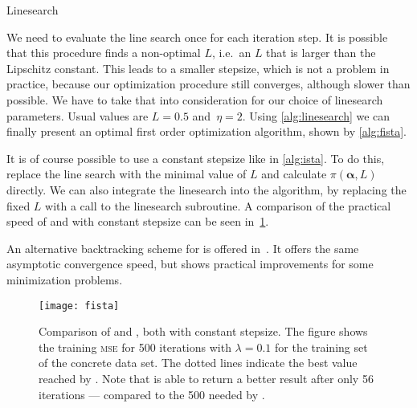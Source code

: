 \begin{algorithm}[h!]
 \caption{Linesearch~\cite{fista}}\label{alg:linesearch}
 \begin{algorithmic}[1]
  \Statex
    \Do
    \State {} 
  \EndFunction
 \end{algorithmic}
\end{algorithm}

We need to evaluate the line search once for each iteration step.
It is possible that this procedure finds a non-optimal \(L\), i.e.~an \(L\) that
is larger than the Lipschitz constant.
This leads to a smaller stepsize, which is not a problem in practice, because
our optimization procedure still converges, although slower than possible.
We have to take that into consideration for our choice of linesearch parameters.
Usual values are \(L = 0.5\) and~\(\eta = 2\).
Using \cref{alg:linesearch} we can finally present an optimal first order optimization algorithm, shown by \cref{alg:fista}.

It is of course possible to use a constant stepsize like in \cref{alg:ista}.
To do this, replace the line search with the minimal value of \(L\) and
calculate \(\pi(\bm{\alpha}, L)\) directly.
We can also integrate the linesearch into the \ista algorithm, by replacing the
fixed \(L\) with a call to the linesearch subroutine.
A comparison of the practical speed of \ista and \fista with constant stepsize can be seen in~\cref{fig:fista-convergence}.

An alternative backtracking scheme for \fista is offered in~\cite{fista-backtracking}.
It offers the same asymptotic convergence speed, but shows practical improvements for some minimization problems.

\begin{figure}[bt]
  \texttt{[image: fista]}
  \caption[Comparison of \fista and \ista]{Comparison of \fista and \ista, both with constant stepsize.
    The figure shows the training \textsc{mse} for 500
    iterations with \(\lambda = 0.1\) for the training set of the concrete
    data set.
    The dotted lines indicate the best value reached by \ista.
    Note that \fista is able to return a better result after only 56
    iterations ---
    compared to the 500 needed by \ista.
  }\label{fig:fista-convergence}
\end{figure}

